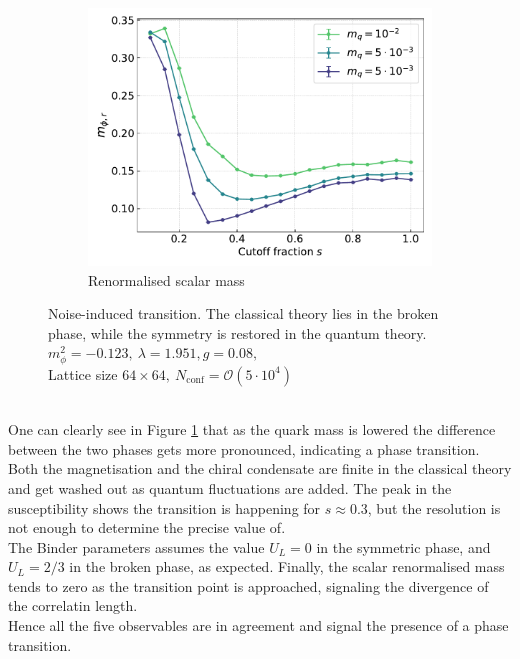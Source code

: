 \begin{figure}[h!]
\begin{subfigure}{0.47\textwidth}
    \includegraphics[width=\textwidth]{figures/chiral_PT/mphir.pdf}
    \caption{Renormalised scalar mass}
\end{subfigure}
\caption[Noise-induced transition]{Noise-induced transition. The classical theory lies in the broken phase, while the symmetry is restored in the quantum theory. \\ $m_\phi^2=-0.123, \ \lambda=1.951, g=0.08,$ \\ Lattice size $64 \times 64, \ N_\text{conf} = \mathcal{O}(5 \cdot 10^4)$}
\label{fig:chiral:symmetry_breaking}
\end{figure}\\
One can clearly see in Figure \ref{fig:chiral:symmetry_breaking} that as the quark  mass is lowered the difference between the two phases gets more pronounced, indicating a phase transition. \\
Both the magnetisation and the chiral condensate are finite in the classical theory and get washed out as quantum fluctuations are added. 
The peak in the susceptibility shows the transition is happening for $s \approx 0.3$, but the resolution is not enough to determine the precise value of. \\ 
The Binder parameters assumes the value $U_L = 0$ in the symmetric phase, and $U_L=2/3$ in the broken phase, as expected. Finally, the scalar renormalised mass tends to zero as the transition point is approached, signaling the divergence of the correlatin length. \\
Hence all the five observables are in agreement and signal the presence of a phase transition. \\
